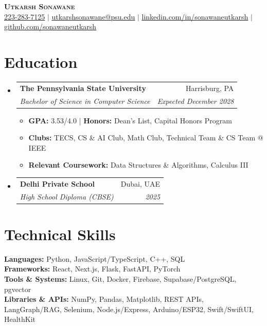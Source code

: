 \documentclass[letterpaper,11pt]{article}
\makeatletter
\newcommand{\resumeItem}[1]{
  \item\footnotesize{#1 \vspace{-4pt}}
}
\newcommand{\resumeSubheading}[4]{
  \vspace{-3pt}\item
  \begin{tabular*}{0.97\textwidth}[t]{l@{\extracolsep{\fill}}r}
    \textbf{#1} & #2 \\
    \textit{\footnotesize #3} & \textit{\footnotesize #4} \\
  \end{tabular*}\vspace{-8pt}
}
\newcommand{\resumeSubHeadingListStart}{\begin{itemize}[leftmargin=0.12in, label={}]}
\newcommand{\resumeSubHeadingListEnd}{\end{itemize}}
\newcommand{\resumeItemListStart}{\begin{itemize}[leftmargin=0.15in]}
\newcommand{\resumeItemListEnd}{\end{itemize}\vspace{-8pt}}
\makeatother
\begin{document}
\begin{center}
  \textbf{\Huge \scshape Utkarsh Sonawane} \\ \vspace{2pt}
  \small
  \uline{223-283-7125} $|$
  \href{mailto:utkarshsonawane@psu.edu}{\uline{utkarshsonawane@psu.edu}} $|$
  \href{https://linkedin.com/in/sonawaneutkarsh}{\uline{linkedin.com/in/sonawaneutkarsh}} $|$
  \href{https://github.com/sonawaneutkarsh}{\uline{github.com/sonawaneutkarsh}}
\end{center}

\section{Education}
\resumeSubHeadingListStart

\resumeSubheading
  {The Pennsylvania State University}
  {Harrisburg, PA}
  {Bachelor of Science in Computer Science}
  {Expected December 2028}

\resumeItemListStart
  \resumeItem{\textbf{GPA:} 3.53/4.0 \;|\; \textbf{Honors:} Dean's List, Capital Honors Program}
  \resumeItem{\textbf{Clubs:} TECS, CS \& AI Club, Math Club, Technical Team \& CS Team @ IEEE}
  \resumeItem{\textbf{Relevant Coursework:} Data Structures \& Algorithms, Calculus III}
\resumeItemListEnd

\resumeSubheading
  {Delhi Private School}
  {Dubai, UAE}
  {High School Diploma (CBSE)}
  {2025}

\resumeSubHeadingListEnd

\section{Technical Skills}
\begin{itemize}[leftmargin=0.15in, label={}]
  \footnotesize{
    \item{
      \textbf{Languages:} Python, JavaScript/TypeScript, C++, SQL \\
      \textbf{Frameworks:} React, Next.js, Flask, FastAPI, PyTorch \\
      \textbf{Tools \& Systems:} Linux, Git, Docker, Firebase, Supabase/PostgreSQL, pgvector \\
      \textbf{Libraries \& APIs:} NumPy, Pandas, Matplotlib, REST APIs, LangGraph/RAG, Selenium, Node.js/Express, Arduino/ESP32, Swift/SwiftUI, HealthKit
    }
  }
\end{itemize}
\end{document}
